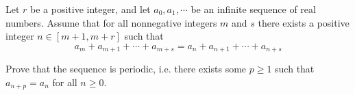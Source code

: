 Let 
$r$
 be a positive integer, and let 
$a_0 , a_1 , \cdots $
 be an infinite sequence of real numbers. Assume that for all nonnegative integers 
$m$
 and 
$s$
 there exists a positive integer 
$n \in [m+1, m+r]$
 such that
\[ a_m + a_{m+1} +\cdots +a_{m+s} = a_n + a_{n+1} +\cdots +a_{n+s} \]


Prove that the sequence is periodic, i.e. there exists some 
$p \ge 1 $
 such that 
$a_{n+p} =a_n $
 for all 
$n \ge 0$.
